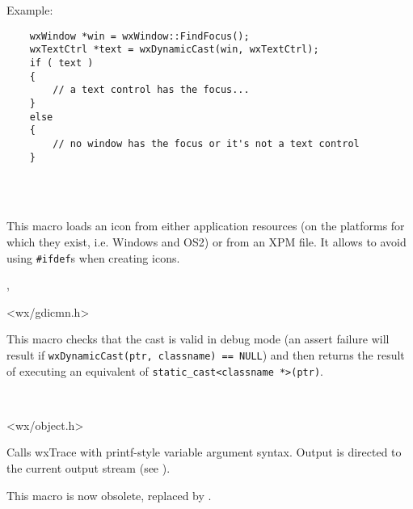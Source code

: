 Example:

\begin{verbatim}
    wxWindow *win = wxWindow::FindFocus();
    wxTextCtrl *text = wxDynamicCast(win, wxTextCtrl);
    if ( text )
    {
        // a text control has the focus...
    }
    else
    {
        // no window has the focus or it's not a text control
    }
\end{verbatim}


\\
\\

\label{wxiconmacro}


This macro loads an icon from either application resources (on the platforms
for which they exist, i.e. Windows and OS2) or from an XPM file. It allows to
avoid using {\tt \#ifdef}s when creating icons.


, 


<wx/gdicmn.h>

\label{wxstaticcast}


This macro checks that the cast is valid in debug mode (an assert failure will
result if {\tt wxDynamicCast(ptr, classname) == NULL}) and then returns the
result of executing an equivalent of {\tt static\_cast<classname *>(ptr)}.

\\

\label{trace}


<wx/object.h>


Calls wxTrace with printf-style variable argument syntax. Output
is directed to the current output stream (see ).

This macro is now obsolete, replaced by .

